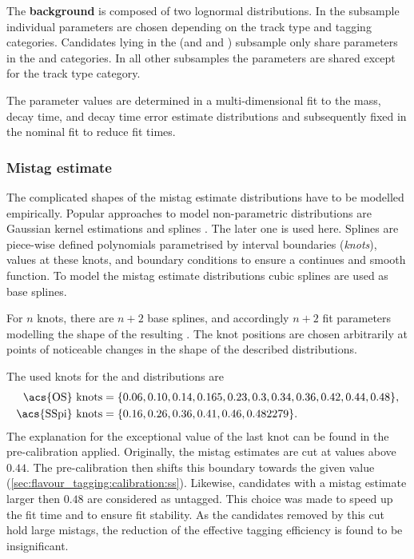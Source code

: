 The \textbf{background} \PDF is composed of two lognormal distributions. In the
\catLL subsample individual parameters are chosen depending on the track type
and tagging categories. Candidates lying in the (\catDD and \catOS and \catAU)
subsample only share parameters in the \catOO and \catOT categories. In all
other subsamples the parameters are shared except for the track type category.

The parameter values are determined in a multi-dimensional fit to the mass,
decay time, and decay time error estimate distributions and subsequently fixed
in the nominal fit to reduce fit times.

\subsubsection{Mistag estimate}
\label{sec:measurement_of_sin2beta:likelihood_fit:model:mistag}

The complicated shapes of the mistag estimate distributions have to be modelled
empirically. Popular approaches to model non-parametric distributions are \eg
Gaussian kernel estimations and splines \cite{Karbach:2014qba}. The later one is
used here. Splines are piece-wise defined polynomials parametrised by interval
boundaries (\emph{knots}), values at these knots, and boundary conditions to
ensure a continues and smooth function. To model the mistag estimate
distributions cubic splines are used as base splines.

For $n$ knots, there are $n+2$ base splines, and accordingly $n+2$ fit
parameters modelling the shape of the resulting \PDF. The knot positions are
chosen arbitrarily at points of noticeable changes in the shape of the described
distributions.

The used knots for the \obsEtaOS and \obsEtaSS distributions are
%
\begin{equation*}
\begin{split}
  \text{\acs{OS} knots} &= \{0.06, 0.10, 0.14, 0.165, 0.23, 0.3, 0.34, 0.36, 0.42, 0.44, 0.48\} , \\
  \text{\acs{SSpi} knots} &= \{0.16, 0.26, 0.36, 0.41, 0.46, 0.482279\} .
\end{split}
\end{equation*}
%
The explanation for the exceptional value of the last \SSpi knot can be found in
the pre-calibration applied. Originally, the \SSpi mistag estimates are cut at
values above $\num{0.44}$. The pre-calibration then shifts this boundary towards
the given value (\cref{sec:flavour_tagging:calibration:ss}). Likewise,
\OS candidates with a mistag estimate larger then $\num{0.48}$ are considered as
\OS untagged. This choice was made to speed up the fit time and to ensure fit
stability. As the candidates removed by this cut hold large mistags, the
reduction of the effective tagging efficiency is found to be insignificant.

